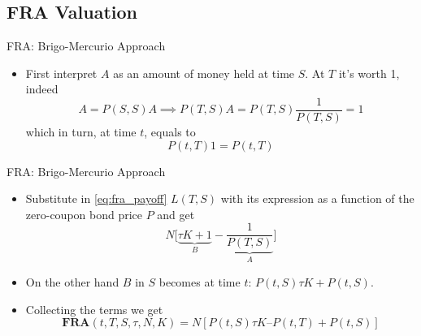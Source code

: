 \documentclass{beamer}
\begin{document}
\subsection{FRA Valuation}
\begin{frame}{FRA: Brigo-Mercurio Approach}
	\begin{itemize}
		\item<3-> First interpret $A$ as an amount of money held at time $S$. At $T$ it's worth 1, indeed 
		\begin{equation*}
			A = P(S,S)A \implies P(T,S)A = P(T,S)\frac{1}{P(T,S)}=1
		\end{equation*}
		which in turn, at time $t$, equals to
		\begin{equation*}
			P(t,T) 1 = P(t,T)
		\end{equation*}
	\end{itemize}
\end{frame}

\begin{frame}{FRA: Brigo-Mercurio Approach}
	\begin{itemize}
		\item Substitute in \cref{eq:fra_payoff} $L(T,S)$ with its expression as a function of the zero-coupon bond price $P$ and get
		\begin{equation*}
			N\bigg[\underbrace{\tau K + 1}_{B} - \underbrace{\frac{1}{P(T, S)}}_{A}\bigg]
		\end{equation*}
		\item<1-> On the other hand $B$ in $S$ becomes at time $t$:
		$P(t,S)\tau K + P(t, S)$.
		\item<2-> Collecting the terms we get
		\begin{equation}
			\textbf{FRA}(t,T,S,\tau,N,K)=N[P(t,S)\tau K–P(t,T)+P(t,S)]
		\end{equation}
			\myendproof
	\end{itemize}
\end{frame}
\end{document}
